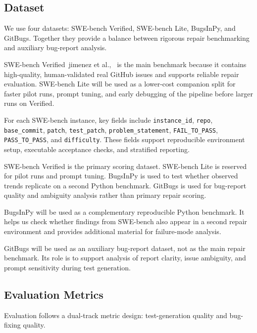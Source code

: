 \documentclass[12pt]{article}
\begin{document}

\subsection{Dataset}

We use four datasets: SWE-bench Verified, SWE-bench Lite, BugsInPy, and GitBugs. Together they provide a balance between rigorous repair benchmarking and auxiliary bug-report analysis.

SWE-bench Verified~jimenez et al.,~\cite{Jimenez2023SWEbench} is the main benchmark because it contains high-quality, human-validated real GitHub issues and supports reliable repair evaluation. SWE-bench Lite will be used as a lower-cost companion split for faster pilot runs, prompt tuning, and early debugging of the pipeline before larger runs on Verified.

For each SWE-bench instance, key fields include \texttt{instance\_id}, \texttt{repo}, \texttt{base\_commit}, \texttt{patch}, \texttt{test\_patch}, \texttt{problem\_statement}, \texttt{FAIL\_TO\_PASS}, \texttt{PASS\_TO\_PASS}, and \texttt{difficulty}. These fields support reproducible environment setup, executable acceptance checks, and stratified reporting.

SWE-bench Verified is the primary scoring dataset. SWE-bench Lite is reserved for pilot runs and prompt tuning. BugsInPy is used to test whether observed trends replicate on a second Python benchmark. GitBugs is used for bug-report quality and ambiguity analysis rather than primary repair scoring.

BugsInPy will be used as a complementary reproducible Python benchmark. It helps us check whether findings from SWE-bench also appear in a second repair environment and provides additional material for failure-mode analysis.

GitBugs will be used as an auxiliary bug-report dataset, not as the main repair benchmark. Its role is to support analysis of report clarity, issue ambiguity, and prompt sensitivity during test generation.

\subsection{Evaluation Metrics}

Evaluation follows a dual-track metric design: test-generation quality and bug-fixing quality.
\end{document}
